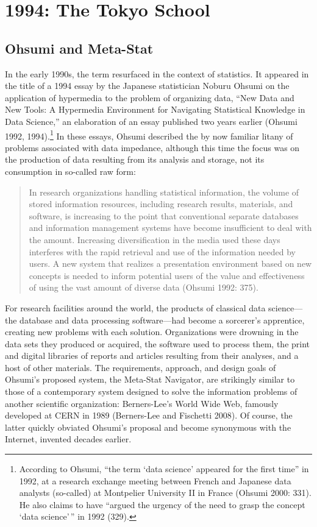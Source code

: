\documentclass[
  letterpaper,
]{report}
\begin{document}
\hypertarget{the-tokyo-school}{%
\section{1994: The Tokyo School}\label{the-tokyo-school}}

\hypertarget{ohsumi-and-meta-stat}{%
\subsection{Ohsumi and Meta-Stat}\label{ohsumi-and-meta-stat}}

In the early 1990s, the term resurfaced in the context of statistics. It
appeared in the title of a 1994 essay by the Japanese statistician
Noburu Ohsumi on the application of hypermedia to the problem of
organizing data, ``New Data and New Tools: A Hypermedia Environment for
Navigating Statistical Knowledge in Data Science,'' an elaboration of an
essay published two years earlier (Ohsumi 1992, 1994).\footnote{According
  to Ohsumi, ``the term `data science' appeared for the first time'' in
  1992, at a research exchange meeting between French and Japanese data
  analysts (so-called) at Montpelier University II in France (Ohsumi
  2000: 331). He also claims to have ``argued the urgency of the need to
  grasp the concept `data science'\,'' in 1992 (329).} In these essays,
Ohsumi described the by now familiar litany of problems associated with
data impedance, although this time the focus was on the production of
data resulting from its analysis and storage, not its consumption in
so-called raw form:

\begin{quote}
In research organizations handling statistical information, the volume
of stored information resources, including research results, materials,
and software, is increasing to the point that conventional separate
databases and information management systems have become insufficient to
deal with the amount. Increasing diversification in the media used these
days interferes with the rapid retrieval and use of the information
needed by users. A new system that realizes a presentation environment
based on new concepts is needed to inform potential users of the value
and effectiveness of using the vast amount of diverse data (Ohsumi 1992:
375).
\end{quote}

For research facilities around the world, the products of classical data
science---the database and data processing software---had become a
sorcerer's apprentice, creating new problems with each solution.
Organizations were drowning in the data sets they produced or acquired,
the software used to process them, the print and digital libraries of
reports and articles resulting from their analyses, and a host of other
materials. The requirements, approach, and design goals of Ohsumi's
proposed system, the Meta-Stat Navigator, are strikingly similar to
those of a contemporary system designed to solve the information
problems of another scientific organization: Berners-Lee's World Wide
Web, famously developed at CERN in 1989 (Berners-Lee and Fischetti
2008). Of course, the latter quickly obviated Ohsumi's proposal and
become synonymous with the Internet, invented decades earlier.
\end{document}
